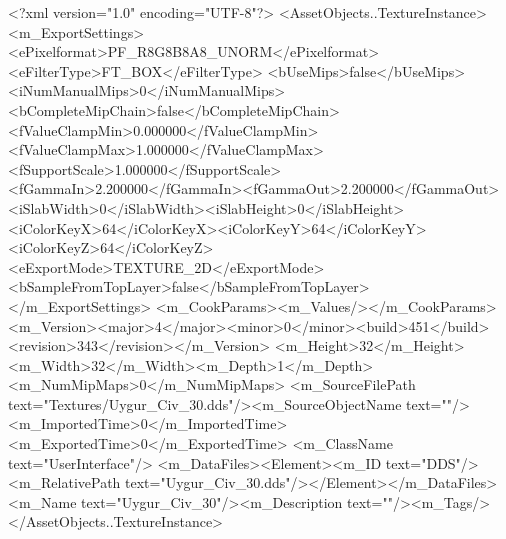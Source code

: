 <?xml version="1.0" encoding="UTF-8"?>
<AssetObjects..TextureInstance>
  <m_ExportSettings>
    <ePixelformat>PF_R8G8B8A8_UNORM</ePixelformat><eFilterType>FT_BOX</eFilterType>
    <bUseMips>false</bUseMips><iNumManualMips>0</iNumManualMips><bCompleteMipChain>false</bCompleteMipChain>
    <fValueClampMin>0.000000</fValueClampMin><fValueClampMax>1.000000</fValueClampMax><fSupportScale>1.000000</fSupportScale>
    <fGammaIn>2.200000</fGammaIn><fGammaOut>2.200000</fGammaOut><iSlabWidth>0</iSlabWidth><iSlabHeight>0</iSlabHeight>
    <iColorKeyX>64</iColorKeyX><iColorKeyY>64</iColorKeyY><iColorKeyZ>64</iColorKeyZ>
    <eExportMode>TEXTURE_2D</eExportMode><bSampleFromTopLayer>false</bSampleFromTopLayer>
  </m_ExportSettings>
  <m_CookParams><m_Values/></m_CookParams>
  <m_Version><major>4</major><minor>0</minor><build>451</build><revision>343</revision></m_Version>
  <m_Height>32</m_Height><m_Width>32</m_Width><m_Depth>1</m_Depth><m_NumMipMaps>0</m_NumMipMaps>
  <m_SourceFilePath text="Textures/Uygur_Civ_30.dds"/><m_SourceObjectName text=""/>
  <m_ImportedTime>0</m_ImportedTime><m_ExportedTime>0</m_ExportedTime>
  <m_ClassName text="UserInterface"/>
  <m_DataFiles><Element><m_ID text="DDS"/><m_RelativePath text="Uygur_Civ_30.dds"/></Element></m_DataFiles>
  <m_Name text="Uygur_Civ_30"/><m_Description text=""/><m_Tags/>
</AssetObjects..TextureInstance>
